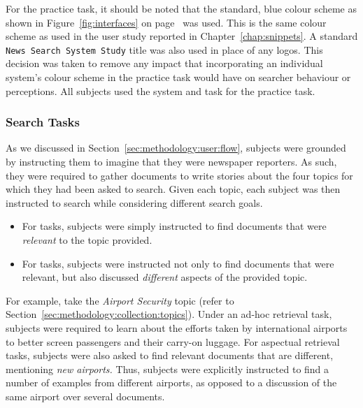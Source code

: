 For the practice task, it should be noted that the standard, blue colour scheme as shown in Figure~\ref{fig:interfaces} on page~\pageref{fig:interfaces} was used. This is the same colour scheme as used in the user study reported in Chapter~\ref{chap:snippets}. A standard \texttt{News Search System Study} title was also used in place of any logos. This decision was taken to remove any impact that incorporating an individual system's colour scheme in the practice task would have on searcher behaviour or perceptions. All subjects used the  system and task for the practice task.

\subsubsection{Search Tasks}\label{sec:diversity:users:method:tasks}
As we discussed in Section~\ref{sec:methodology:user:flow}, subjects were grounded by instructing them to imagine that they were newspaper reporters. As such, they were required to gather documents to write stories about the four topics for which they had been asked to search. Given each topic, each subject was then instructed to search while considering different search goals.

\begin{itemize}
    \item{For  tasks, subjects were simply instructed to find documents that were \emph{relevant} to the topic provided.}
    \item{For  tasks, subjects were instructed not only to find documents that were relevant, but also discussed \emph{different} aspects of the provided topic.}
\end{itemize}

For example, take the \emph{Airport Security} topic (refer to Section~\ref{sec:methodology:collection:topics}). Under an ad-hoc retrieval task, subjects were required to learn about the efforts taken by international airports to better screen passengers and their carry-on luggage. For aspectual retrieval tasks, subjects were also asked to find relevant documents that are different, mentioning \emph{new airports.} Thus, subjects were explicitly instructed to find a number of examples from different airports, as opposed to a discussion of the same airport over several documents.


